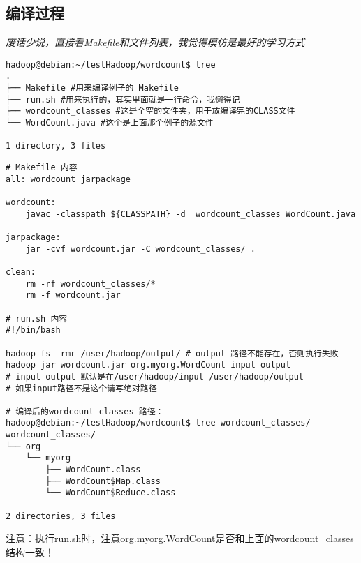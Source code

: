 \documentclass{article}
\begin{document}
\subsection{编译过程}
\textit{废话少说，直接看Makefile和文件列表，我觉得模仿是最好的学习方式}

\begin{verbatim}
hadoop@debian:~/testHadoop/wordcount$ tree 
.
├── Makefile #用来编译例子的 Makefile
├── run.sh #用来执行的，其实里面就是一行命令，我懒得记
├── wordcount_classes #这是个空的文件夹，用于放编译完的CLASS文件
└── WordCount.java #这个是上面那个例子的源文件

1 directory, 3 files
\end{verbatim}

\begin{verbatim}
# Makefile 内容
all: wordcount jarpackage

wordcount: 
	javac -classpath ${CLASSPATH} -d  wordcount_classes WordCount.java

jarpackage:
	jar -cvf wordcount.jar -C wordcount_classes/ . 

clean:
	rm -rf wordcount_classes/*
	rm -f wordcount.jar

# run.sh 内容
#!/bin/bash

hadoop fs -rmr /user/hadoop/output/ # output 路径不能存在，否则执行失败
hadoop jar wordcount.jar org.myorg.WordCount input output 
# input output 默认是在/user/hadoop/input /user/hadoop/output
# 如果input路径不是这个请写绝对路径

# 编译后的wordcount_classes 路径：
hadoop@debian:~/testHadoop/wordcount$ tree wordcount_classes/
wordcount_classes/
└── org
    └── myorg
        ├── WordCount.class
        ├── WordCount$Map.class
        └── WordCount$Reduce.class

2 directories, 3 files
\end{verbatim}

\textsf{注意：执行run.sh时，注意org.myorg.WordCount是否和上面的wordcount\_classes 结构一致！}
\end{document}
